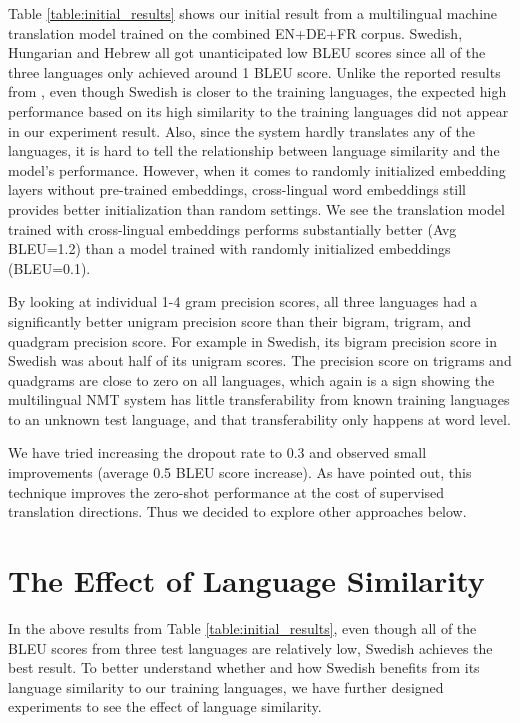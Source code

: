 \documentclass[thesis,fonts=libertine]{cluu}
\begin{document}
Table \ref{table:initial_results} shows our initial result from a multilingual machine translation model trained on the combined EN+DE+FR corpus. Swedish, Hungarian and Hebrew all got unanticipated low BLEU scores since all of the three languages only achieved around 1 BLEU score. Unlike the reported results from \textcite{Qi:2018aa}, even though Swedish is closer to the training languages, the expected high performance based on its high similarity to the training languages did not appear in our experiment result. Also, since the system hardly translates any of the languages, it is hard to tell the relationship between language similarity and the model's performance. However, when it comes to randomly initialized embedding layers without pre-trained embeddings, cross-lingual word embeddings still provides better initialization than random settings. We see the translation model trained with cross-lingual embeddings performs substantially better (Avg BLEU=1.2) than a model trained with randomly initialized embeddings (BLEU=0.1).

By looking at individual 1-4 gram precision scores, all three languages had a significantly better unigram precision score than their bigram, trigram, and quadgram precision score. For example in Swedish, its bigram precision score in Swedish was about half of its unigram scores. The precision score on trigrams and quadgrams are close to zero on all languages, which again is a sign showing the multilingual NMT system has little transferability from known training languages to an unknown test language, and that transferability only happens at word level.

We have tried increasing the dropout rate to 0.3 and observed small improvements (average 0.5 BLEU score increase). As \textcite{Arivazhagan:2019aa} have pointed out, this technique improves the zero-shot performance at the cost of supervised translation directions. Thus we decided to explore other approaches below.

\section{The Effect of Language Similarity}
\label{sec:langauge_similarity}

In the above results from Table \ref{table:initial_results}, even though all of the BLEU scores from three test languages are relatively low, Swedish achieves the best result. To better understand whether and how Swedish benefits from its language similarity to our training languages, we have further designed experiments to see the effect of language similarity.
\end{document}

